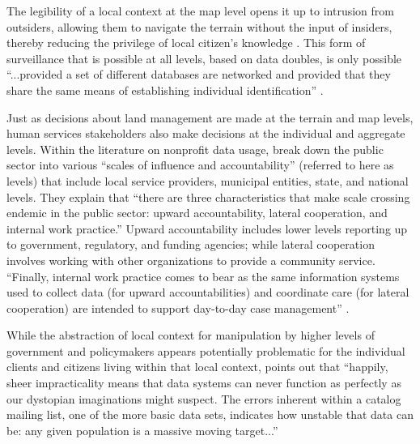 The legibility of a local context at the map level opens it up to intrusion from outsiders, allowing them to navigate the terrain without the input of insiders, thereby reducing the privilege of local citizen’s knowledge \citep{Scott1998Seeing}. This form of surveillance that is possible at all levels, based on data doubles, is only possible “...provided a set of different databases are networked and provided that they share the same means of establishing individual identification” \citep{Raley2013Dataveillance}. 

Just as decisions about land management are made at the terrain and map levels, human services stakeholders also make decisions at the individual and aggregate levels. Within the literature on nonprofit data usage, \cite{LeDantec2008Trenches} break down the public sector into various “scales of influence and accountability” (referred to here as levels) that include local service providers, municipal entities, state, and national levels. They explain that “there are three characteristics that make scale crossing endemic in the public sector: upward accountability, lateral cooperation, and internal work practice.” Upward accountability includes lower levels reporting up to government, regulatory, and funding agencies; while lateral cooperation involves working with other organizations to provide a community service. “Finally, internal work practice comes to bear as the same information systems used to collect data (for upward accountabilities) and coordinate care (for lateral cooperation) are intended to support day-to-day case management” \citep{LeDantec2008Trenches}.

While the abstraction of local context for manipulation by higher levels of government and policymakers appears potentially problematic for the individual clients and citizens living within that local context, \cite{Raley2013Dataveillance} points out that “happily, sheer impracticality means that data systems can never function as perfectly as our dystopian imaginations might suspect. The errors inherent within a catalog mailing list, one of the more basic data sets, indicates how unstable that data can be: any given population is a massive moving target...”

